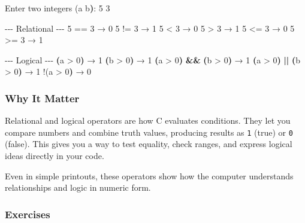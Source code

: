 \documentclass[
  letterpaper,
  DIV=11,
  numbers=noendperiod]{scrreprt}
\newenvironment{Shaded}{\begin{snugshade}}{\end{snugshade}}
\newcommand{\AttributeTok}[1]{\textcolor[rgb]{0.40,0.45,0.13}{#1}}
\newcommand{\BuiltInTok}[1]{\textcolor[rgb]{0.00,0.23,0.31}{#1}}
\newcommand{\ErrorTok}[1]{\textcolor[rgb]{0.68,0.00,0.00}{#1}}
\newcommand{\ExtensionTok}[1]{\textcolor[rgb]{0.00,0.23,0.31}{#1}}
\newcommand{\KeywordTok}[1]{\textcolor[rgb]{0.00,0.23,0.31}{\textbf{#1}}}
\newcommand{\NormalTok}[1]{\textcolor[rgb]{0.00,0.23,0.31}{#1}}
\newcommand{\OperatorTok}[1]{\textcolor[rgb]{0.37,0.37,0.37}{#1}}
\begin{document}
\begin{Shaded}
\begin{Highlighting}[]
\ExtensionTok{Enter}\NormalTok{ two integers }\ErrorTok{(}\ExtensionTok{a}\NormalTok{ b}\KeywordTok{)}\BuiltInTok{:}\NormalTok{ 5 3}

\ExtensionTok{{-}{-}{-}}\NormalTok{ Relational }\AttributeTok{{-}{-}{-}}
\ExtensionTok{5}\NormalTok{ == 3 → 0}
\ExtensionTok{5}\NormalTok{ != 3 → 1}
\ExtensionTok{5} \OperatorTok{\textless{}}\NormalTok{  3 → 0}
\ExtensionTok{5} \OperatorTok{\textgreater{}}\NormalTok{  3 → 1}
\ExtensionTok{5} \OperatorTok{\textless{}}\NormalTok{= 3 → 0}
\ExtensionTok{5} \OperatorTok{\textgreater{}}\NormalTok{= 3 → 1}

\ExtensionTok{{-}{-}{-}}\NormalTok{ Logical }\AttributeTok{{-}{-}{-}}
\KeywordTok{(}\ExtensionTok{a} \OperatorTok{\textgreater{}}\NormalTok{ 0}\KeywordTok{)} \ExtensionTok{→}\NormalTok{ 1}
\KeywordTok{(}\ExtensionTok{b} \OperatorTok{\textgreater{}}\NormalTok{ 0}\KeywordTok{)} \ExtensionTok{→}\NormalTok{ 1}
\KeywordTok{(}\ExtensionTok{a} \OperatorTok{\textgreater{}}\NormalTok{ 0}\KeywordTok{)} \KeywordTok{\&\&} \KeywordTok{(}\ExtensionTok{b} \OperatorTok{\textgreater{}}\NormalTok{ 0}\KeywordTok{)} \ExtensionTok{→}\NormalTok{ 1}
\KeywordTok{(}\ExtensionTok{a} \OperatorTok{\textgreater{}}\NormalTok{ 0}\KeywordTok{)} \KeywordTok{||} \KeywordTok{(}\ExtensionTok{b} \OperatorTok{\textgreater{}}\NormalTok{ 0}\KeywordTok{)} \ExtensionTok{→}\NormalTok{ 1}
\ExtensionTok{!}\ErrorTok{(}\ExtensionTok{a} \OperatorTok{\textgreater{}}\NormalTok{ 0}\KeywordTok{)} \ExtensionTok{→}\NormalTok{ 0}
\end{Highlighting}
\end{Shaded}

\subsubsection{Why It Matter}\label{why-it-matter}

Relational and logical operators are how C evaluates conditions. They
let you compare numbers and combine truth values, producing results as
\texttt{1} (true) or \texttt{0} (false). This gives you a way to test
equality, check ranges, and express logical ideas directly in your code.

Even in simple printouts, these operators show how the computer
understands relationships and logic in numeric form.

\subsubsection{Exercises}\label{exercises-12}
\end{document}
